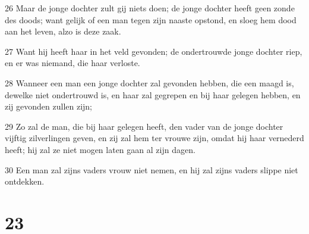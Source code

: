 \par 26 Maar de jonge dochter zult gij niets doen; de jonge dochter heeft geen zonde des doods; want gelijk of een man tegen zijn naaste opstond, en sloeg hem dood aan het leven, alzo is deze zaak.
\par 27 Want hij heeft haar in het veld gevonden; de ondertrouwde jonge dochter riep, en er was niemand, die haar verloste.
\par 28 Wanneer een man een jonge dochter zal gevonden hebben, die een maagd is, dewelke niet ondertrouwd is, en haar zal gegrepen en bij haar gelegen hebben, en zij gevonden zullen zijn;
\par 29 Zo zal de man, die bij haar gelegen heeft, den vader van de jonge dochter vijftig zilverlingen geven, en zij zal hem ter vrouwe zijn, omdat hij haar vernederd heeft; hij zal ze niet mogen laten gaan al zijn dagen.
\par 30 Een man zal zijns vaders vrouw niet nemen, en hij zal zijns vaders slippe niet ontdekken.

\chapter{23}

